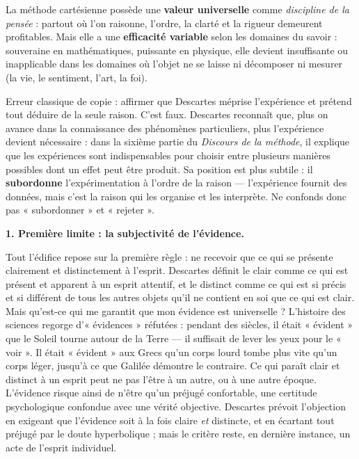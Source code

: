 \documentclass[11pt]{article}
\newcounter{popsec}
\newcounter{popsub}
\newcommand{\courssub}[1]{%
  \stepcounter{popsub}%
  \par\vspace{9pt}\noindent{\popxbold\fontsize{11.5}{13}\selectfont\color{popink}{\color{poporange}\thepopsec.\thepopsub}\hspace{6pt}#1}\par\nopagebreak\vspace{4pt}
}
\begin{document}
\begin{propriete}
La méthode cartésienne possède une \textbf{valeur universelle} comme \emph{discipline de la pensée} : partout où l'on raisonne, l'ordre, la clarté et la rigueur demeurent profitables. Mais elle a une \textbf{efficacité variable} selon les domaines du savoir : souveraine en mathématiques, puissante en physique, elle devient insuffisante ou inapplicable dans les domaines où l'objet ne se laisse ni décomposer ni mesurer (la vie, le sentiment, l'art, la foi).
\end{propriete}

\begin{attention}
Erreur classique de copie : affirmer que Descartes méprise l'expérience et prétend tout déduire de la seule raison. C'est faux. Descartes reconnaît que, plus on avance dans la connaissance des phénomènes particuliers, plus l'expérience devient nécessaire : dans la sixième partie du \emph{Discours de la méthode}, il explique que les expériences sont indispensables pour choisir entre plusieurs manières possibles dont un effet peut être produit. Sa position est plus subtile : il \textbf{subordonne} l'expérimentation à l'ordre de la raison — l'expérience fournit des données, mais c'est la raison qui les organise et les interprète. Ne confonds donc pas « subordonner » et « rejeter ».
\end{attention}

\courssub{Les limites de la méthode cartésienne}

\textbf{1. Première limite : la subjectivité de l'évidence.}\par
Tout l'édifice repose sur la première règle : ne recevoir que ce qui se présente clairement et distinctement à l'esprit. Descartes définit le clair comme ce qui est présent et apparent à un esprit attentif, et le distinct comme ce qui est si précis et si différent de tous les autres objets qu'il ne contient en soi que ce qui est clair. Mais qu'est-ce qui me garantit que mon évidence est universelle ? L'histoire des sciences regorge d'« évidences » réfutées : pendant des siècles, il était « évident » que le Soleil tourne autour de la Terre — il suffisait de lever les yeux pour le « voir ». Il était « évident » aux Grecs qu'un corps lourd tombe plus vite qu'un corps léger, jusqu'à ce que Galilée démontre le contraire. Ce qui paraît clair et distinct à un esprit peut ne pas l'être à un autre, ou à une autre époque. L'évidence risque ainsi de n'être qu'un préjugé confortable, une certitude psychologique confondue avec une vérité objective. Descartes prévoit l'objection en exigeant que l'évidence soit à la fois claire \emph{et} distincte, et en écartant tout préjugé par le doute hyperbolique ; mais le critère reste, en dernière instance, un acte de l'esprit individuel.
\end{document}
